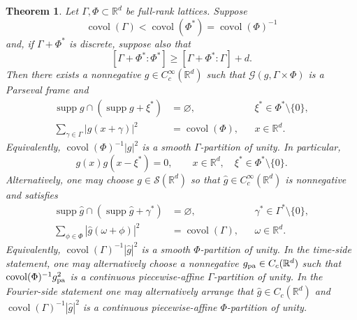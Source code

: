 \documentclass[11pt,reqno]{amsart}
\numberwithin{equation}{section}
\newtheorem{theorem}{Theorem}[section]
\theoremstyle{definition}
\theoremstyle{remark}
\newcommand{\R}{\mathbb R}
\newcommand{\covol}{\operatorname{covol}}
\newcommand{\supp}{\operatorname{supp}}
\newcommand{\G}{\mathcal G}
\newcommand{\Sclass}{\mathcal S}
\begin{document}
\begin{theorem}
\label{thm:smooth-gabor-positive}
Let $\Gamma,\Phi\subset\R^d$ be full-rank lattices.  Suppose
\[
 \covol(\Gamma)<\covol(\Phi^*)=\covol(\Phi)^{-1}
\]
and, if $\Gamma+\Phi^*$ is discrete, suppose also that
\[
 [\Gamma+\Phi^*:\Phi^*]\ge[\Gamma+\Phi^*:\Gamma]+d.
\]
Then there exists a nonnegative $g\in C_c^\infty(\R^d)$ such that
$\G(g,\Gamma\times\Phi)$ is a Parseval frame and
\begin{align}
 \supp g\cap(\supp g+\xi^*)&=\varnothing,
 &&\xi^*\in\Phi^*\setminus\{0\},
 \label{eq:general-separable-support}\\
 \sum_{\gamma\in\Gamma}|g(x+\gamma)|^2&=\covol(\Phi),
 &&x\in\R^d.
 \label{eq:general-separable-periodization}
\end{align}
Equivalently, $\covol(\Phi)^{-1}|g|^2$ is a smooth
$\Gamma$-partition of unity.  In particular,
\[
 g(x)g(x-\xi^*)=0,
 \qquad x\in\R^d,\quad \xi^*\in\Phi^*\setminus\{0\}.
\]
Alternatively, one may choose $g\in\Sclass(\R^d)$ so that
$\widehat g\in C_c^\infty(\R^d)$ is nonnegative and satisfies
\begin{align}
 \supp\widehat g\cap(\supp\widehat g+\gamma^*)&=\varnothing,
 &&\gamma^*\in\Gamma^*\setminus\{0\},
 \label{eq:general-fourier-support}\\
 \sum_{\phi\in\Phi}|\widehat g(\omega+\phi)|^2&=\covol(\Gamma),
 &&\omega\in\R^d.
 \label{eq:general-fourier-periodization}
\end{align}
Equivalently, $\covol(\Gamma)^{-1}|\widehat g|^2$ is a smooth
$\Phi$-partition of unity.
In the time-side statement, one may alternatively choose a nonnegative
$g_{\rm pa}\in C_c(\R^d)$ such that
$\covol(\Phi)^{-1}g_{\rm pa}^2$ is a continuous piecewise-affine
$\Gamma$-partition of unity.  In the Fourier-side statement one may
alternatively arrange that $\widehat g\in C_c(\R^d)$ and
$\covol(\Gamma)^{-1}|\widehat g|^2$ is a continuous piecewise-affine
$\Phi$-partition of unity.
\end{theorem}
\end{document}
